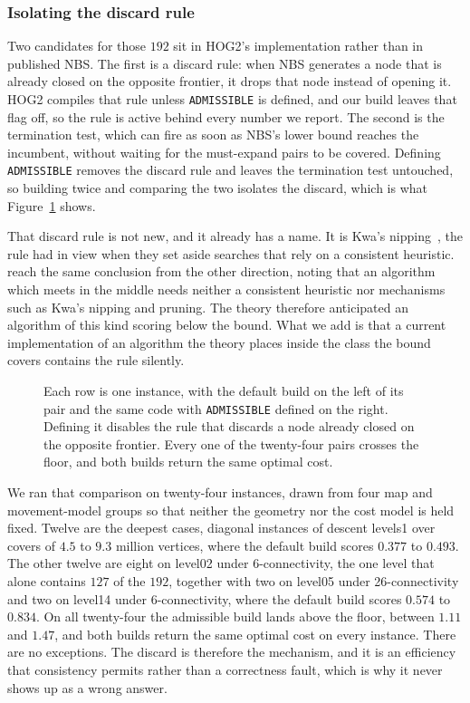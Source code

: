 \documentclass[letterpaper]{article} %
\begin{document}
\subsubsection{Isolating the discard rule}
Two candidates for those $192$ sit in HOG2's implementation rather than in published NBS. The first is a discard rule: when NBS generates a node that is already closed on the opposite frontier, it drops that node instead of opening it. HOG2 compiles that rule unless \texttt{ADMISSIBLE} is defined, and our build leaves that flag off, so the rule is active behind every number we report. The second is the termination test, which can fire as soon as NBS's lower bound reaches the incumbent, without waiting for the must-expand pairs to be covered. Defining \texttt{ADMISSIBLE} removes the discard rule and leaves the termination test untouched, so building twice and comparing the two isolates the discard, which is what Figure~\ref{fig:nipping} shows.

That discard rule is not new, and it already has a name. It is Kwa's nipping~\cite{kwa1989bs}, the rule \citet{eckerle2017sufficient} had in view when they set aside searches that rely on a consistent heuristic. \citet{holte2017mm} reach the same conclusion from the other direction, noting that an algorithm which meets in the middle needs neither a consistent heuristic nor mechanisms such as Kwa's nipping and pruning. The theory therefore anticipated an algorithm of this kind scoring below the bound. What we add is that a current implementation of an algorithm the theory places inside the class the bound covers contains the rule silently.

\begin{figure}[t] \centering
  
  \caption{Each row is one instance, with the default build on the left of its pair and the same code with \texttt{ADMISSIBLE} defined on the right. Defining it disables the rule that discards a node already closed on the opposite frontier. Every one of the twenty-four pairs crosses the floor, and both builds return the same optimal cost.}\label{fig:nipping}
\end{figure}
We ran that comparison on twenty-four instances, drawn from four map and movement-model groups so that neither the geometry nor the cost model is held fixed. Twelve are the deepest cases, diagonal instances of descent levels1 over covers of $4.5$ to $9.3$ million vertices, where the default build scores $0.377$ to $0.493$. The other twelve are eight on level02 under 6-connectivity, the one level that alone contains $127$ of the $192$, together with two on level05 under 26-connectivity and two on level14 under 6-connectivity, where the default build scores $0.574$ to $0.834$. On all twenty-four the admissible build lands above the floor, between $1.11$ and $1.47$, and both builds return the same optimal cost on every instance. There are no exceptions. The discard is therefore the mechanism, and it is an efficiency that consistency permits rather than a correctness fault, which is why it never shows up as a wrong answer.
\end{document}

